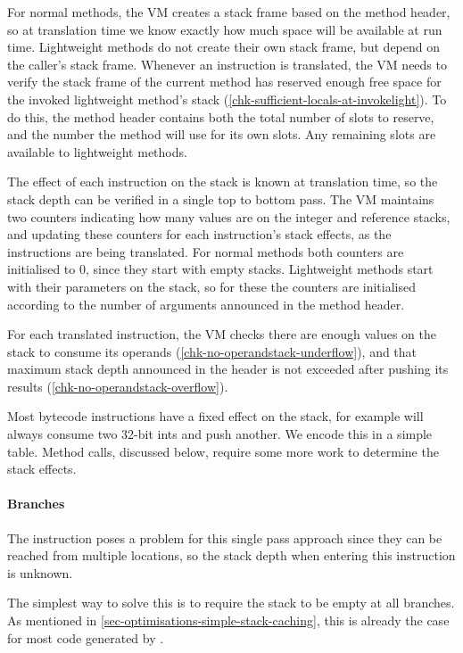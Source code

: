 For normal methods, the VM creates a stack frame based on the method header, so at translation time we know exactly how much space will be available at run time. Lightweight methods do not create their own stack frame, but depend on the caller's stack frame. Whenever an  instruction is translated, the VM needs to verify the stack frame of the current method has reserved enough free space for the invoked lightweight method's stack (\ref{chk-sufficient-locals-at-invokelight}). To do this, the method header contains both the total number of slots to reserve, and the number the method will use for its own slots. Any remaining slots are available to lightweight methods.

The effect of each instruction on the stack is known at translation time, so the stack depth can be verified in a single top to bottom pass. The VM maintains two counters indicating how many values are on the integer and reference stacks, and updating these counters for each instruction's stack effects, as the instructions are being translated. For normal methods both counters are initialised to 0, since they start with empty stacks. Lightweight methods start with their parameters on the stack, so for these the counters are initialised according to the number of arguments announced in the method header.

For each translated instruction, the VM checks there are enough values on the stack to consume its operands (\ref{chk-no-operandstack-underflow}), and that maximum stack depth announced in the header is not exceeded after pushing its results (\ref{chk-no-operandstack-overflow}).

Most bytecode instructions have a fixed effect on the stack, for example  will always consume two 32-bit ints and push another. We encode this in a simple table. Method calls, discussed below, require some more work to determine the stack effects. 

\paragraph{Branches}
The  instruction poses a problem for this single pass approach since they can be reached from multiple locations, so the stack depth when entering this instruction is unknown.

The simplest way to solve this is to require the stack to be empty at all branches. As mentioned in \ref{sec-optimisations-simple-stack-caching}, this is already the case for most code generated by .

